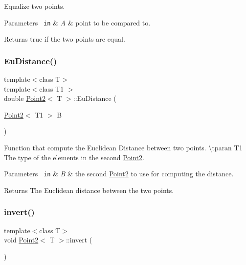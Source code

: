 Equalize two points. 


\begin{DoxyParams}[1]{Parameters}
\mbox{\texttt{ in}}  & {\em A} & point to be compared to. \\
\hline
\end{DoxyParams}
\begin{DoxyReturn}{Returns}
true if the two points are equal. 
\end{DoxyReturn}
\mbox{\label{class_point2_aa930b619ed2efeda96b4210ee3b8cb9c}} 
\subsubsection{\texorpdfstring{EuDistance()}{EuDistance()}}
{\footnotesize\ttfamily template$<$class T$>$ \\
template$<$class T1 $>$ \\
double \mbox{\hyperlink{class_point2}{Point2}}$<$ T $>$\+::Eu\+Distance (\begin{DoxyParamCaption}\item[{\mbox{\hyperlink{class_point2}{Point2}}$<$ T1 $>$}]{B }\end{DoxyParamCaption})\hspace{0.3cm}{\ttfamily [inline]}}



Function that compute the Euclidean Distance between two points. \textbackslash{}tparan T1 The type of the elements in the second {\ttfamily \mbox{\hyperlink{class_point2}{Point2}}}. 


\begin{DoxyParams}[1]{Parameters}
\mbox{\texttt{ in}}  & {\em B} & the second {\ttfamily \mbox{\hyperlink{class_point2}{Point2}}} to use for computing the distance. \\
\hline
\end{DoxyParams}
\begin{DoxyReturn}{Returns}
The Euclidean distance between the two points. 
\end{DoxyReturn}
\mbox{\label{class_point2_aabc6ec4c0ed4c7757ac61a9448195c97}} 
\subsubsection{\texorpdfstring{invert()}{invert()}}
{\footnotesize\ttfamily template$<$class T$>$ \\
void \mbox{\hyperlink{class_point2}{Point2}}$<$ T $>$\+::invert (\begin{DoxyParamCaption}{ }\end{DoxyParamCaption})\hspace{0.3cm}{\ttfamily [inline]}}




